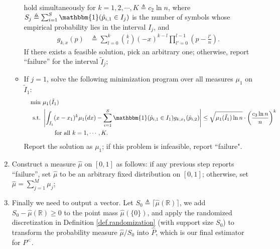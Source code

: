 \documentclass[final,12pt]{colt2018} %
\newcommand{\reals}{\mathbb{R}}
\begin{document}
\begin{enumerate}
\begin{itemize}
\begin{align}
		\end{align}
		hold simultaneously for $k=1,2,\cdots,K\triangleq c_2\ln n$, where $S_j\triangleq \sum_{i=1}^S \mathbbm{1}(\hat{p}_{i,1}\in I_j)$ is the number of symbols whose empirical probability lies in the interval $I_j$, and
		\begin{align*}
		g_{k,x}(p) &\triangleq \sum_{l=0}^k \binom{k}{l}(-x)^{k-l} \prod_{l'=0}^{l-1}\left(p-\frac{l'}{n}\right).
		\end{align*}
		If there exists a feasible solution, pick an arbitrary one; otherwise, report ``failure'' for the interval $\tilde{I}_j$;
		\item If $j=1$, solve the following minimization program over all measures $\mu_1$ on $\tilde{I}_1$:
		\begin{equation}
		\begin{aligned}
		\min & ~ \mu_1(\tilde{I}_1)  \\
		\text{\rm s.t.}     & ~ \left|\int_{\tilde{I}_1} (x-x_1)^k\mu_1(dx) - \sum_{i=1}^S \mathbbm{1}(\hat{p}_{i,1}\in I_1)g_{k,x_1}(\hat{p}_{i,2})\right| \le \sqrt{\mu_1(\tilde{I}_1)\ln n}\cdot \left(\frac{c_3\ln n}{n}\right)^{k} \\
		& ~ \qquad \text{for all }k=1,\cdots,K.
		\end{aligned}
		\label{eq.LP_min}
		\end{equation}
		Report the solution as $\mu_1$; if this problem is infeasible, report ``failure".
	\end{itemize}
	\item Construct a measure $\hat{\mu}$ on $[0,1]$ as follows: if any previous step reports ``failure'', set $\hat{\mu}$ to be an arbitrary fixed distribution on $[0,1]$; otherwise, set $\hat{\mu} = \sum_{j=1}^M \mu_j$;
	\item Finally we need to output a vector. Let $S_0\triangleq \lceil \hat{\mu}(\reals) \rceil$, we add $S_0-\hat{\mu}(\reals)\ge 0$ to the point mass $\hat{\mu}(\{0\})$, and apply the randomized discretization in Definition \ref{def.randomization} (with support size $S_0$) to transform the probability measure $\hat{\mu}/S_0$ into $\hat{P}$, which is our final estimator for $P^<$.
\end{enumerate}
\end{document}
